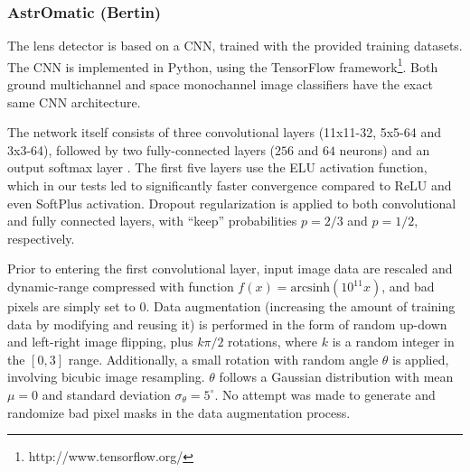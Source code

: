 \documentclass[useAMS,usenatbib]{mnras}
\newcommand{\fl}[1]{{\color{magenta}FL: #1}}
\begin{document}

\subsubsection{AstrOmatic (Bertin)}

The lens detector is based on a CNN, trained with the provided training datasets. The CNN is implemented in Python, using the TensorFlow framework\footnote{http://www.tensorflow.org/}. Both ground multichannel and space monochannel image classifiers have the exact same CNN architecture.

The network itself consists of three convolutional layers (11x11-32, 5x5-64 and 3x3-64), followed by two fully-connected layers ($256$ and $64$ neurons) and an output softmax layer . The first five layers use the ELU activation function, which in our tests led to significantly faster convergence compared to ReLU and even SoftPlus activation. Dropout regularization is applied to both convolutional and fully connected layers, with ``keep'' probabilities $p=2/3$ and $p=1/2$, respectively.

Prior to entering the first convolutional layer, input image data are rescaled and dynamic-range compressed with function $f(x) =
\mathrm{arcsinh} (10^{11} x)$, and bad pixels are simply set to 0.
Data augmentation (increasing the amount of training data by modifying and reusing it) is performed in the form of random up-down and left-right image flipping, plus $k\pi/2$ rotations, where $k$ is a random integer in the $[0,3]$ range. Additionally, a small rotation with random angle $\theta$ is applied, involving bicubic image resampling. $\theta$ follows a Gaussian distribution with mean $\mu=0$ and standard deviation $\sigma_{\theta}=5^{\circ}$. No attempt was made to generate and randomize bad pixel masks in the data augmentation process.
\end{document}
